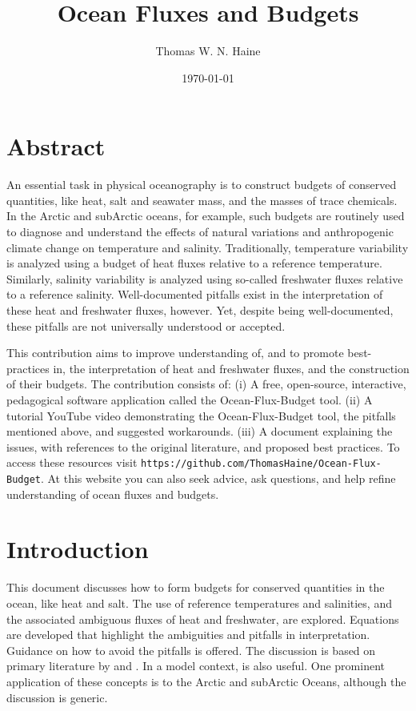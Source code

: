 \documentclass[10pt]{amsart}
\title{Ocean Fluxes and Budgets}
\author{Thomas W. N. Haine}
\date{\today}                                           %
\begin{document}
\maketitle


\section*{Abstract}

An essential task in physical oceanography is to construct budgets of conserved quantities, like heat, salt and seawater mass, and the masses of trace chemicals. 
In the Arctic and subArctic oceans, for example, such budgets are routinely used to diagnose and understand the effects of natural variations and anthropogenic climate change on temperature and salinity.
Traditionally, temperature variability is analyzed using a budget of heat fluxes relative to a reference temperature. 
Similarly, salinity variability is analyzed using so-called freshwater fluxes relative to a reference salinity.
Well-documented pitfalls exist in the interpretation of these heat and freshwater fluxes, however.
Yet, despite being well-documented, these pitfalls are not universally understood or accepted.

This contribution aims to improve understanding of, and to promote best-practices in, the interpretation of heat and freshwater fluxes, and the construction of their budgets.
The contribution consists of:
(i) A free, open-source, interactive, pedagogical software application called the Ocean-Flux-Budget tool.
(ii) A tutorial YouTube video demonstrating the Ocean-Flux-Budget tool, the pitfalls mentioned above, and suggested workarounds.
(iii) A document explaining the issues, with references to the original literature, and proposed best practices.
To access these resources visit \texttt{https://github.com/ThomasHaine/Ocean-Flux-Budget}.
At this website you can also seek advice, ask questions, and help refine understanding of ocean fluxes and budgets.




\section{Introduction}
This document discusses how to form budgets for conserved quantities in the ocean, like heat and salt. 
The use of reference temperatures and salinities, and the associated ambiguous fluxes of heat and freshwater, are explored.
Equations are developed that highlight the ambiguities and pitfalls in interpretation.
Guidance on how to avoid the pitfalls is offered.
The discussion is based on primary literature by \cite{schauer&besczcynska-moller09,schauer&losch19,bacon_etal15} and \cite{tsubouchi_etal12}.
In a model context, \cite{piecuch_etal17} is also useful.
One prominent application of these concepts is to the Arctic and subArctic Oceans, although the discussion is generic.
\end{document}

